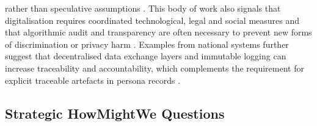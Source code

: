 \documentclass{article}
\begin{document}
rather than speculative assumptions \parencites[7808872][8]{7808872}[2]{4807303}[3]{4692551}. This body of work also signals that digitalisation requires coordinated technological, legal and social measures and that algorithmic audit and transparency are often necessary to prevent new forms of discrimination or privacy harm \parencites[2]{0967765}. Examples from national systems further suggest that decentralised data exchange layers and immutable logging can increase traceability and accountability, which complements the requirement for explicit traceable artefacts in persona records \parencites[2]{0967765}.

\subsection{Strategic How\-Might\-We Questions}
\end{document}
